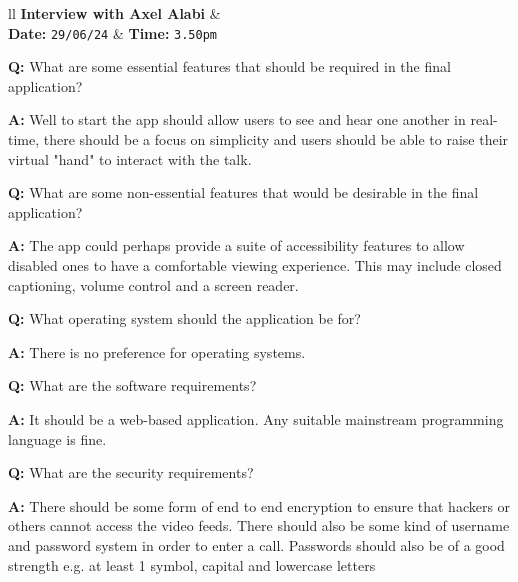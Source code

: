 \begin{tcolorbox}[
  boxrule=0pt, frame empty, colback=lightgray, arc=0pt
]
  \begin{tblr}{ll}
    \textbf{Interview with Axel Alabi} & {}\\
    \textbf{Date: } \texttt{29/06/24} &
    {\hspace{-1.5cm} \textbf{Time: } \texttt{3.50pm}}
  \end{tblr}

  \vspace{0.2cm}

  \textbf{Q:} What are some essential features that should be
  required in the final application? \vspace{0.05cm}

  \textbf{A:} Well to start the app should allow users to see 
  and hear one another in real-time, there should be a focus on
  simplicity and users should be able to raise their virtual 
  "hand" to interact with the talk. \vspace{0.25cm}

  \textbf{Q:} What are some non-essential features that would
  be desirable in the final application? \vspace{0.05cm}

  \textbf{A:} The app could perhaps provide a suite of 
  accessibility features to allow disabled ones to have a 
  comfortable viewing experience. This may include closed
  captioning, volume control and a screen reader.
  \vspace{0.25cm}

  \textbf{Q:} What operating system should the application be 
  for? \vspace{0.05cm}

  \textbf{A:} There is no preference for operating systems.
  \vspace{0.25cm}

  \textbf{Q:} What are the software requirements? 
  \vspace{0.05cm}

  \textbf{A:} It should be a web-based application. Any 
  suitable mainstream programming language is fine.
  \vspace{0.25cm}

  \textbf{Q:} What are the security requirements?
  \vspace{0.05cm}

  \textbf{A:} There should be some form of end to end 
  encryption to ensure that hackers or others cannot access the  video feeds. There should also be some kind of username and 
  password system in order to enter a call. Passwords should 
  also be of a good strength e.g. at least 1 symbol, capital
  and lowercase letters
  \vspace{0.25cm}

\end{tcolorbox}

